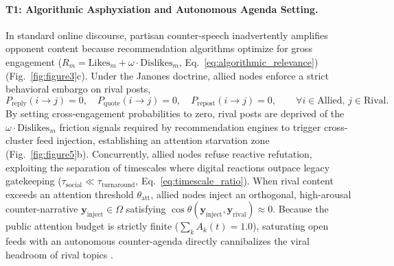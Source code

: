 \documentclass{article}
\begin{document}
\paragraph{T1: Algorithmic Asphyxiation and Autonomous Agenda Setting.}
In standard online discourse, partisan counter-speech inadvertently amplifies opponent content because recommendation algorithms optimize for gross engagement ($R_m = \mathrm{Likes}_m + \omega \cdot \mathrm{Dislikes}_m$, Eq.~\eqref{eq:algorithmic_relevance}) \citep{crockett2017moral, bail2018exposure} (Fig.~\ref{fig:figure3}c). Under the Janones doctrine, allied nodes enforce a strict behavioral embargo on rival posts,
\begin{equation}
    P_{\mathrm{reply}}(i \to j) = 0, \quad P_{\mathrm{quote}}(i \to j) = 0, \quad P_{\mathrm{repost}}(i \to j) = 0, \qquad \forall i \in \mathrm{Allied}, \, j \in \mathrm{Rival}.
    \label{eq:asphyxiation_rule}
\end{equation}
By setting cross-engagement probabilities to zero, rival posts are deprived of the $\omega \cdot \mathrm{Dislikes}_m$ friction signals required by recommendation engines to trigger cross-cluster feed injection, establishing an attention starvation zone (Fig.~\ref{fig:figure5}b). Concurrently, allied nodes refuse reactive refutation, exploiting the separation of timescales where digital reactions outpace legacy gatekeeping ($\tau_{\mathrm{social}} \ll \tau_{\mathrm{turnaround}}$, Eq.~\eqref{eq:timescale_ratio}). When rival content exceeds an attention threshold $\theta_{\mathrm{att}}$, allied nodes inject an orthogonal, high-arousal counter-narrative $\mathbf{y}_{\mathrm{inject}} \in \Omega$ satisfying $\cos\theta(\mathbf{y}_{\mathrm{inject}}, \mathbf{y}_{\mathrm{rival}}) \approx 0$. Because the public attention budget is strictly finite ($\sum_k A_k(t) = 1.0$), saturating open feeds with an autonomous counter-agenda directly cannibalizes the viral headroom of rival topics \citep{wu2007novelty}.
\end{document}
